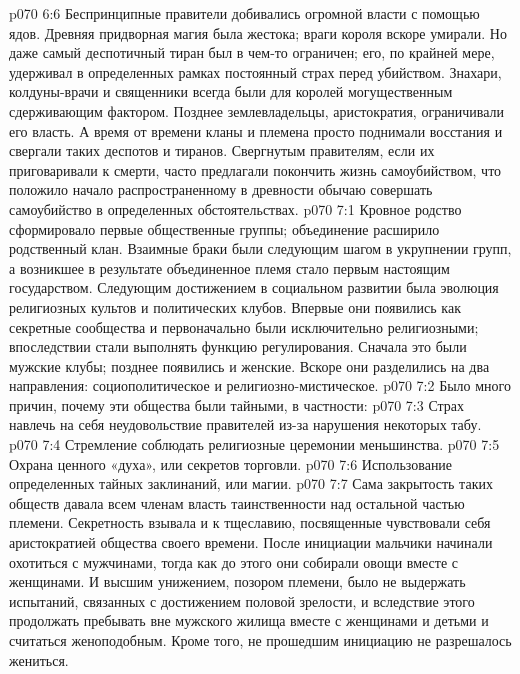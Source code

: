 \vs p070 6:6 \pc Беспринципные правители добивались огромной власти с помощью ядов. Древняя придворная магия была жестока; враги короля вскоре умирали. Но даже самый деспотичный тиран был в чем\hyp{}то ограничен; его, по крайней мере, удерживал в определенных рамках постоянный страх перед убийством. Знахари, колдуны\hyp{}врачи и священники всегда были для королей могущественным сдерживающим фактором. Позднее землевладельцы, аристократия, ограничивали его власть. А время от времени кланы и племена просто поднимали восстания и свергали таких деспотов и тиранов. Свергнутым правителям, если их приговаривали к смерти, часто предлагали покончить жизнь самоубийством, что положило начало распространенному в древности обычаю совершать самоубийство в определенных обстоятельствах.
\vs p070 7:1 Кровное родство сформировало первые общественные группы; объединение расширило родственный клан. Взаимные браки были следующим шагом в укрупнении групп, а возникшее в результате объединенное племя стало первым настоящим государством. Следующим достижением в социальном развитии была эволюция религиозных культов и политических клубов. Впервые они появились как секретные сообщества и первоначально были исключительно религиозными; впоследствии стали выполнять функцию регулирования. Сначала это были мужские клубы; позднее появились и женские. Вскоре они разделились на два направления: социополитическое и религиозно\hyp{}мистическое.
\vs p070 7:2 \pc Было много причин, почему эти общества были тайными, в частности:
\vs p070 7:3 \bibnobreakspace Страх навлечь на себя неудовольствие правителей из\hyp{}за нарушения некоторых табу.
\vs p070 7:4 \bibnobreakspace Стремление соблюдать религиозные церемонии меньшинства.
\vs p070 7:5 \bibnobreakspace Охрана ценного «духа», или секретов торговли.
\vs p070 7:6 \bibnobreakspace Использование определенных тайных заклинаний, или магии.
\vs p070 7:7 \pc Сама закрытость таких обществ давала всем членам власть таинственности над остальной частью племени. Секретность взывала и к тщеславию, посвященные чувствовали себя аристократией общества своего времени. После инициации мальчики начинали охотиться с мужчинами, тогда как до этого они собирали овощи вместе с женщинами. И высшим унижением, позором племени, было не выдержать испытаний, связанных с достижением половой зрелости, и вследствие этого продолжать пребывать вне мужского жилища вместе с женщинами и детьми и считаться женоподобным. Кроме того, не прошедшим инициацию не разрешалось жениться.
